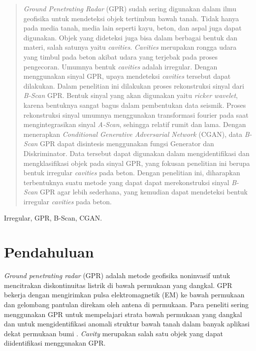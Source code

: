 \documentclass[conference]{IEEEtran}
\begin{document}
\begin{abstract}
\emph{Ground Penetrating Radar} (GPR) sudah sering digunakan dalam ilmu geofisika untuk mendeteksi objek tertimbun bawah tanah. 
Tidak hanya pada media tanah, media lain seperti kayu, beton, dan aspal juga dapat digunakan. 
Objek yang dideteksi juga bisa dalam berbagai bentuk dan materi, salah satunya yaitu \emph{cavities}. 
\emph{Cavities} merupakan rongga udara yang timbul pada beton akibat udara yang terjebak pada proses pengecoran. 
Umumnya bentuk \emph{cavities} adalah irregular. 
Dengan menggunakan sinyal GPR, upaya mendeteksi \emph{cavities} tersebut dapat dilakukan. 
Dalam penelitian ini dilakukan proses rekonstruksi sinyal dari \emph{B-Scan} GPR. 
Bentuk sinyal yang akan digunakan yaitu \emph{ricker wavelet}, karena bentuknya sangat bagus dalam pembentukan data seismik. 
Proses rekonstruksi sinyal umumnya menggunakan transformasi fourier pada saat mengintegrasikan sinyal \emph{A-Scan}, sehingga relatif rumit dan lama. 
Dengan menerapkan \emph{Conditional Generative Adversarial Network} (CGAN), data \emph{B-Scan} GPR dapat disintesis menggunakan fungsi Generator dan Diskriminator. 
Data tersebut dapat digunakan dalam mengidentifikasi dan mengklasifikasi objek pada sinyal GPR, yang fokusan penelitian ini berupa bentuk irregular \emph{cavities} pada beton. 
Dengan penelitian ini, diharapkan terbentuknya suatu metode yang dapat dapat merekonstruksi sinyal \emph{B-Scan} GPR agar lebih sederhana, yang kemudian dapat mendeteksi bentuk irregular \emph{cavities} pada beton.
\end{abstract}

\begin{IEEEkeywords}
Irregular, GPR, B-Scan, CGAN.
\end{IEEEkeywords}

\section{Pendahuluan}
\emph{Ground penetrating radar} (GPR) adalah metode geofisika noninvasif untuk mencitrakan diskontinuitas listrik di bawah permukaan yang dangkal. 
GPR bekerja dengan mengirimkan pulsa elektromagnetik (EM) ke bawah permukaan dan gelombang pantulan direkam oleh antena di permukaan. 
Para peneliti sering menggunakan GPR untuk mempelajari strata bawah permukaan yang dangkal dan untuk mengidentifikasi anomali struktur bawah tanah dalam banyak aplikasi dekat permukaan bumi \cite{a1}. 
\emph{Cavity} merupakan salah satu objek yang dapat diidentifikasi menggunakan GPR.
\end{document}
